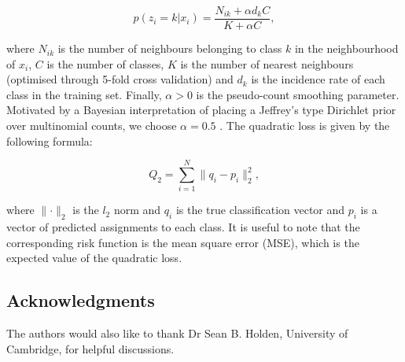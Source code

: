 \documentclass[12pt,english]{article}\usepackage[]{graphicx}\usepackage[]{color}
\begin{document}
\begin{equation}
p(z_i = k|x_i) = \frac{N_{ik} + \alpha d_k C}{K + \alpha C},
\end{equation}

where $N_{ik}$ is the number of neighbours belonging to class $k$ in
the neighbourhood of $x_i$, $C$ is the number of classes, $K$ is the
number of nearest neighbours (optimised through 5-fold cross
validation) and $d_k$ is the incidence rate of each class in the
training set. Finally, $\alpha >0$ is the pseudo-count smoothing
parameter. Motivated by a Bayesian interpretation of placing a
Jeffrey's type Dirichlet prior over multinomial counts, we choose
$\alpha = 0.5$ \citep{Hazimeh:2015, Valcarce:2016, Manning:2008}.  The
quadratic loss is given by the following formula:

\begin{equation}
  Q_2 = \sum_{i = 1}^{N}\lVert q_i - p_i\rVert_2^2,
\end{equation}

where $\lVert\cdot\rVert_2$ is the $l_2$ norm and $q_i$ is the true
classification vector and $p_i$ is a vector of predicted assignments
to each class. It is useful to note that the corresponding risk
function is the mean square error (MSE), which is the expected value
of the quadratic loss.





\subsection*{Acknowledgments}

The authors would also like to thank Dr Sean B. Holden, University of
Cambridge, for helpful discussions.




\end{document}
